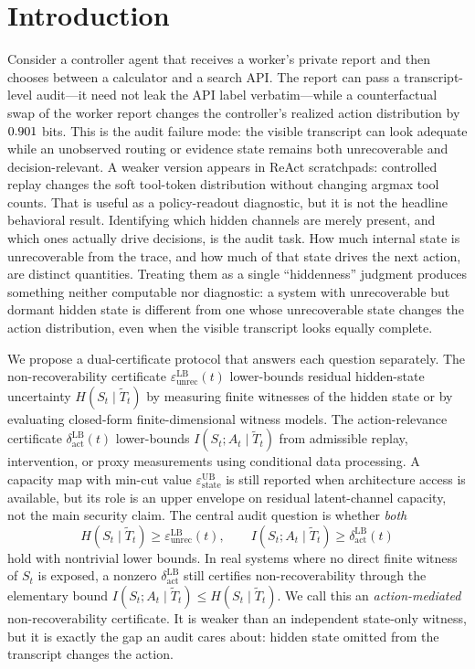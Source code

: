   \section{Introduction}
  \label{sec:introduction}

  Consider a controller agent that receives a worker's private report and then
  chooses between a calculator and a search API. The report can pass a
  transcript-level audit---it need not leak the API label verbatim---while a
  counterfactual swap of the worker report changes the controller's realized
  action distribution by $0.901$ bits. This is the
  audit failure mode: the visible transcript can look adequate while an
  unobserved routing or evidence state remains both unrecoverable and
  decision-relevant. A weaker version appears in ReAct scratchpads: controlled
  replay changes the soft tool-token distribution without changing argmax tool
  counts. That is useful as a policy-readout diagnostic, but it is not the
  headline behavioral result. Identifying which hidden channels are merely
  present, and which ones actually drive decisions, is the audit task.
  How much internal state is unrecoverable from the trace, and how much of that
  state drives the next action, are distinct quantities. Treating them as a
  single ``hiddenness'' judgment produces something neither computable nor
  diagnostic: a system with unrecoverable but dormant hidden state is different
  from one whose unrecoverable state changes the action distribution, even when
  the visible transcript looks equally complete.

  We propose a dual-certificate protocol that answers each question separately.
  The non-recoverability certificate
  $\varepsilon_\mathrm{unrec}^\mathrm{LB}(t)$ lower-bounds residual hidden-state
  uncertainty $H(S_t \mid \tilde T_t)$ by measuring finite witnesses of the
  hidden state or by evaluating closed-form finite-dimensional witness models.
  The action-relevance certificate
  $\delta_\mathrm{act}^\mathrm{LB}(t)$ lower-bounds
  $I(S_t;A_t\mid\tilde T_t)$ from admissible replay, intervention, or proxy
  measurements using conditional data processing. A capacity map with min-cut
  value $\varepsilon_\text{state}^\text{UB}$ is still reported when
  architecture access is available, but its role is an upper envelope on
  residual latent-channel capacity, not the main security claim. The central audit
  question is whether
  \emph{both}
  \[
    H(S_t\mid\tilde T_t)\geq\varepsilon_\mathrm{unrec}^\mathrm{LB}(t),
    \qquad
    I(S_t;A_t\mid\tilde T_t)\geq\delta_\mathrm{act}^\mathrm{LB}(t)
  \]
  hold with nontrivial lower bounds.
  In real systems where no direct finite witness of $S_t$ is exposed, a
  nonzero $\delta_\mathrm{act}^\mathrm{LB}$ still certifies
  non-recoverability through the elementary bound
  $I(S_t;A_t\mid\tilde T_t)\leq H(S_t\mid\tilde T_t)$. We call this an
  \emph{action-mediated} non-recoverability certificate. It is weaker than an
  independent state-only witness, but it is exactly the gap an audit cares
  about: hidden state omitted from the transcript changes the action.

